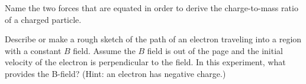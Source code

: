 \documentclass[addpoints]{physlabs}
\date{\today}
\begin{document}
\maketitle

\begin{prelab}

    \filbreak
    \question[1] Name the two forces that are equated in order to derive the charge-to-mass ratio of a charged particle.
    \begin{solution}[4cm]
        
    \end{solution}

    \filbreak
    \question[1] Describe or make a rough sketch of the path of an electron traveling into a region with a constant $B$ field. Assume the $B$ field is out of the page and the initial velocity of the electron is perpendicular to the field. In this experiment, what provides the B-field?{\color{red} (Hint: an electron has negative charge.)}
    \begin{solution}[4cm]
        
    \end{solution}
    
\end{prelab}
\end{document}

